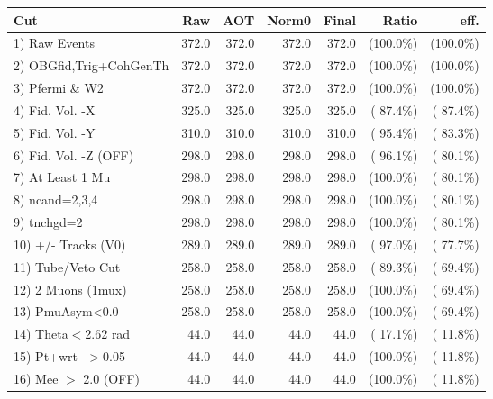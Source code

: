  \begin{table}[h!]\centering
 \begin{tabular}{||l||r|r|r|r|r|r||}
 \hline
 \hline
 Cut & Raw & AOT & Norm0 & Final & Ratio & eff.       \\
 \hline
  1) Raw Events           &        372.0 &        372.0 &        372.0 &        372.0 & (100.0\%) & (100.0\%) \\
  2) OBGfid,Trig+CohGenTh &        372.0 &        372.0 &        372.0 &        372.0 & (100.0\%) & (100.0\%) \\
  3) Pfermi \& W2         &        372.0 &        372.0 &        372.0 &        372.0 & (100.0\%) & (100.0\%) \\
  4) Fid. Vol. -X         &        325.0 &        325.0 &        325.0 &        325.0 & ( 87.4\%) & ( 87.4\%) \\
  5) Fid. Vol. -Y         &        310.0 &        310.0 &        310.0 &        310.0 & ( 95.4\%) & ( 83.3\%) \\
  6) Fid. Vol. -Z (OFF)   &        298.0 &        298.0 &        298.0 &        298.0 & ( 96.1\%) & ( 80.1\%) \\
  7) At Least 1 Mu        &        298.0 &        298.0 &        298.0 &        298.0 & (100.0\%) & ( 80.1\%) \\
  8) ncand=2,3,4          &        298.0 &        298.0 &        298.0 &        298.0 & (100.0\%) & ( 80.1\%) \\
  9) tnchgd=2             &        298.0 &        298.0 &        298.0 &        298.0 & (100.0\%) & ( 80.1\%) \\
 10) +/- Tracks (V0)      &        289.0 &        289.0 &        289.0 &        289.0 & ( 97.0\%) & ( 77.7\%) \\
 11) Tube/Veto Cut        &        258.0 &        258.0 &        258.0 &        258.0 & ( 89.3\%) & ( 69.4\%) \\
 12) 2 Muons (1mux)       &        258.0 &        258.0 &        258.0 &        258.0 & (100.0\%) & ( 69.4\%) \\
 13) PmuAsym<0.0          &        258.0 &        258.0 &        258.0 &        258.0 & (100.0\%) & ( 69.4\%) \\
 14) Theta$<$2.62 rad     &         44.0 &         44.0 &         44.0 &         44.0 & ( 17.1\%) & ( 11.8\%) \\
 15) Pt+wrt- $>$0.05      &         44.0 &         44.0 &         44.0 &         44.0 & (100.0\%) & ( 11.8\%) \\
 16) Mee $>$ 2.0  (OFF)   &         44.0 &         44.0 &         44.0 &         44.0 & (100.0\%) & ( 11.8\%) \\

\end{tabular}
\end{table}
